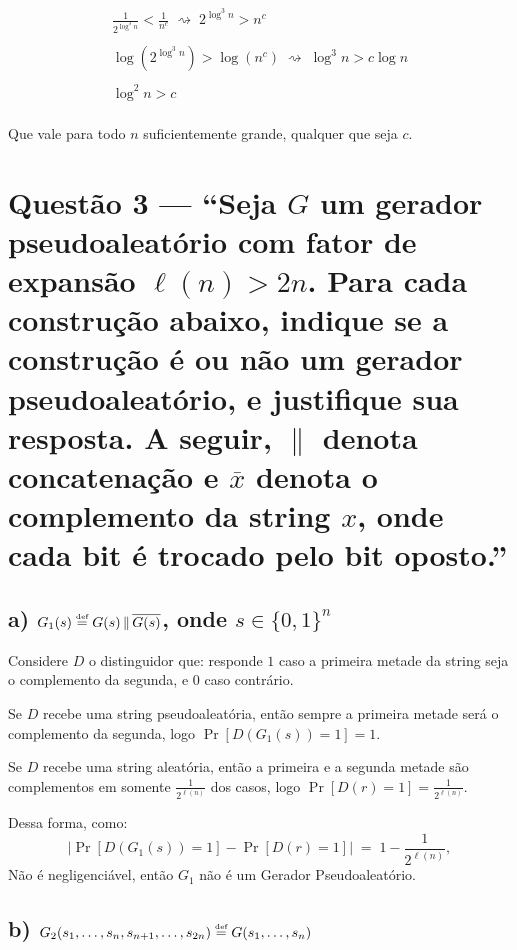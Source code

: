 \documentclass[11pt,a4paper]{article}
\newcommand{\defeq}{\stackrel{\text{\tiny def}}{=}}
\begin{document}
\begin{gather*}
    \frac{1}{2^{\log^{3} n}} < \frac{1}{n^{c}} \;\rightsquigarrow\; 2^{\log^{3} n} > n^{c} \\ \\
    \log\!\left(2^{\log^{3} n}\right) > \log\!\left(n^{c}\right) \;\rightsquigarrow\; \log^{3} n > c \log n \\ \\
    \log^{2} n > c\\
\end{gather*}

Que vale para todo $n$ suficientemente grande, qualquer que seja $c$.

\clearpage

\section*{Questão 3 --- ``Seja $G$ um gerador pseudoaleatório com fator de
expansão $\ell(n) > 2n$. Para cada construção abaixo, indique se a construção é
ou não um gerador pseudoaleatório, e justifique sua resposta. A seguir, $\|$
    denota concatenação e $\overline{x}$ denota o complemento da string $x$, onde
    cada bit é trocado pelo bit oposto.''}

\subsection*{a) $G_1(s) \defeq G(s) \,\|\, \overline{G(s)}$, onde
    $s \in \{0,1\}^{n}$}

Considere $D$ o distinguidor que: responde $1$ caso a primeira metade da string seja o complemento da segunda, e
$0$ caso contrário.

Se $D$ recebe uma string pseudoaleatória, então sempre a primeira metade será o
complemento da segunda, logo $\Pr[D(G_1(s)) = 1] = 1$.

Se $D$ recebe uma string aleatória, então a primeira e a segunda metade são
complementos em somente $\frac{1}{2^{\ell(n)}}$ dos casos, logo
$\Pr[D(r) = 1] = \frac{1}{2^{\ell(n)}}$.

Dessa forma, como:
\[
    \bigl|\Pr[D(G_1(s)) = 1] - \Pr[D(r) = 1]\bigr|
    \;=\; 1 - \frac{1}{2^{\ell(n)}},
\]
Não é negligenciável, então $G_1$ não é um Gerador Pseudoaleatório.

\subsection*{b) $G_2(s_1,\ldots,s_n,s_{n+1},\ldots,s_{2n})
\defeq G(s_1,\ldots,s_n)$}
\end{document}
